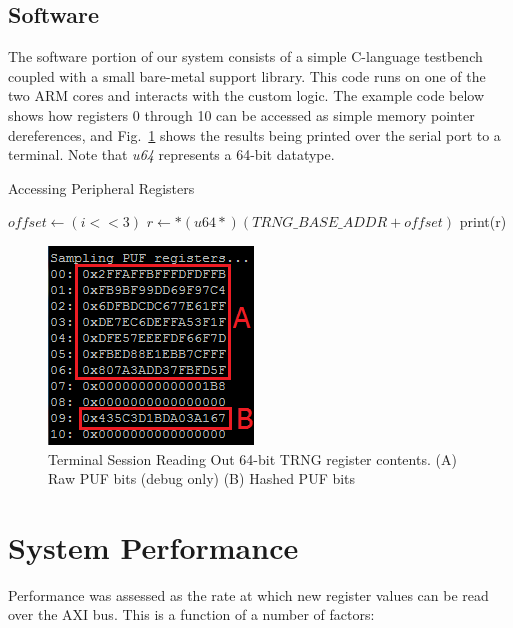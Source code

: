 \documentclass[journal]{IEEEtran}
\begin{document}
\subsection{Software}

The software portion of our system consists of a simple C-language testbench coupled with a small bare-metal support library. This code runs on one of the two ARM cores and interacts with the custom logic. The example code below shows how registers 0 through 10 can be accessed as simple memory pointer dereferences, and Fig.~\ref{fig:dump} shows the results being printed over the serial port to a terminal. Note that \emph{u64} represents a 64-bit datatype. 

\begin{algorithm}
  \caption{Accessing Peripheral Registers}\label{euclid}
  \begin{algorithmic}[1]
	\State $offset\gets (i<<3)$
        \State $r\gets *( u64 *) (TRNG\_BASE\_ADDR+offset)$
	\State print(r)
      \EndFor      
    \EndProcedure
  \end{algorithmic}
\end{algorithm}


\begin{figure}[!th]
\centering
\includegraphics[scale=.9]{Images/dump2.png}
\caption{ Terminal Session Reading Out 64-bit TRNG register contents. (A) Raw PUF bits (debug only) (B) Hashed PUF bits}
\label{fig:dump}
\end{figure} 


\section{System Performance}

Performance was assessed as the rate at which new register values can be read over the AXI bus. This is a function of a number of factors:
\end{document}
